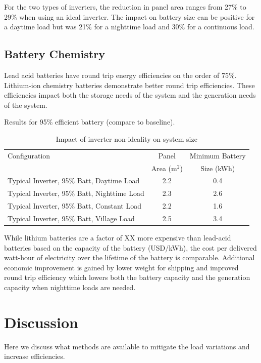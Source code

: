 \documentclass[conference]{IEEEtran}
\begin{document}
For the two types of inverters, the reduction in panel area
ranges from 27\% to 29\% when using an ideal inverter.
The impact on battery size can be positive for a daytime
load but was 21\% for a nighttime load and 30\% for a
continuous load.

\subsection{Battery Chemistry}

Lead acid batteries have round trip energy efficiencies on the
order of 75\%.
Lithium-ion chemistry batteries demonstrate better round trip
efficiencies.
These efficiencies impact both the storage needs of the system
and the generation needs of the system.

Results for 95\% efficient battery (compare to baseline).

\begin{table}
\centering
\begin{tabular}{@{} p{}
                @{} c
                @{} c @{}}
Configuration & Panel          & Minimum Battery \\
              & Area (m$^2$)   & Size (kWh)      \\
\hline
Typical Inverter, 95\% Batt, Daytime Load   & 2.2 & 0.4 \\
Typical Inverter, 95\% Batt, Nighttime Load & 2.3 & 2.6 \\
Typical Inverter, 95\% Batt, Constant Load  & 2.2 & 1.6 \\
Typical Inverter, 95\% Batt, Village Load   & 2.5 & 3.4 \\
\end{tabular}
\caption{Impact of inverter non-ideality on system size}
\label{sizetable}
\end{table}


While lithium batteries are a factor of XX more expensive
than lead-acid batteries based on the capacity of the battery
(USD/kWh), the cost per delivered watt-hour of electricity
over the lifetime of the battery is comparable.
Additional economic improvement is gained by lower weight
for shipping and improved round trip efficiency which lowers
both the battery capacity and the generation capacity when nighttime
loads are needed.

\section{Discussion}
Here we discuss what methods are available to mitigate the
load variations and increase efficiencies.
\end{document}
